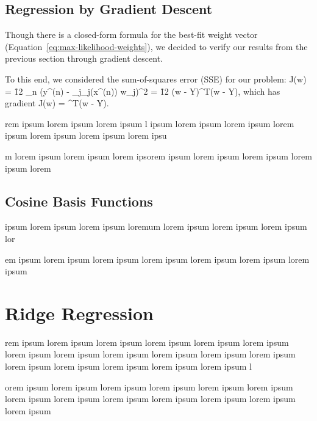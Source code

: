 \documentclass{amsart}
\begin{document}
\subsection{Regression by Gradient Descent}

Though there is a closed-form formula for the best-fit weight vector (Equation~\ref{eq:max-likelihood-weights}), we decided to verify our results from the previous section through gradient descent.

To this end, we considered the sum-of-squares error (SSE) for our problem:
\beq
J(w) = \f12 \sum_n \lt(y^{(n)} - \sum_j\phi_j(x^{(n)}) w_j\rt)^2 = \f12 (\Phi w - Y)^T(\Phi w - Y),
\eeq
which has gradient
\beq
\nabla J(w) = \Phi^T(\Phi w - Y).
\eeq




rem ipsum lorem ipsum lorem ipsum l ipsum lorem ipsum lorem ipsum lorem ipsum lorem ipsum lorem ipsum lorem ipsu

m lorem ipsum lorem ipsum lorem ipsorem ipsum lorem ipsum lorem ipsum lorem ipsum lorem 

\subsection{Cosine Basis Functions}

ipsum lorem ipsum lorem ipsum loremum lorem ipsum lorem ipsum lorem ipsum lor

em ipsum lorem ipsum lorem ipsum lorem ipsum lorem ipsum lorem ipsum lorem ipsum





\section{Ridge Regression}


rem ipsum lorem ipsum lorem ipsum lorem ipsum lorem ipsum lorem ipsum lorem ipsum lorem ipsum lorem ipsum lorem ipsum lorem ipsum lorem ipsum lorem ipsum lorem ipsum lorem ipsum lorem ipsum lorem ipsum l

orem ipsum lorem ipsum lorem ipsum lorem ipsum lorem ipsum lorem ipsum lorem ipsum lorem ipsum lorem ipsum lorem ipsum lorem ipsum lorem ipsum lorem ipsum




\end{document}

